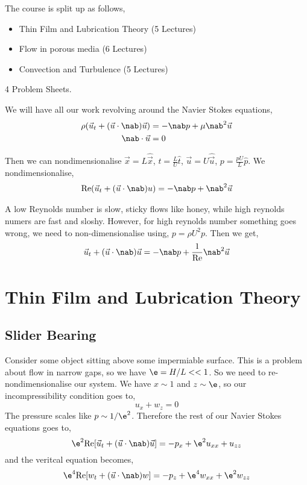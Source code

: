 
The course is split up as follows,
\begin{itemize}
  \item Thin Film and Lubrication Theory (5 Lectures)
  \item Flow in porous media (6 Lectures)
  \item Convection and Turbulence (5 Lectures)
\end{itemize}
4 Problem Sheets.

\noindent
We will have all our work revolving around the Navier Stokes equations,
\begin{align*}
  \rho( \vec u_t + (\vec u \cdot \nab)\vec u) &= -\nab p + \mu \nab^2 \vec u\\
  \nab \cdot \vec u &= 0
\end{align*}

Then we can nondimensionalise $\vec x = L\hat{\vec x}$, $t = \frac{L}{U}\hat t$, $\vec u = U\hat{\vec u}$, $p = \frac{pU}{L}\hat p$. We nondimensionalise,
\begin{align*}
  \mathrm{Re} (\vec u_t + (\vec u \cdot \nab) u ) = -\nab p + \nab^2 \vec u
\end{align*}

A low Reynolds number is slow, sticky flows like honey, while high reynolds numers are fast and sloshy. However, for high reynolds number something goes wrong, we need to non-dimensionalise using, $p = \rho U^2 p$. Then we get,
$$ \vec u_t + (\vec u \cdot \nab)\vec u = - \nab p + \frac{1}{\mathrm{Re}}\nab^2 \vec u $$

\section{Thin Film and Lubrication Theory}
\subsection{Slider Bearing}
Consider some object sitting above some impermiable surface. This is a problem about flow in narrow gaps, so we have $\e = H/L << 1$. So we need to re-nondimensionalise our system. We have $x \sim 1$ and $z \sim \e$, so our incompressibility condition goes to,
$$ u_x + w_z = 0 $$
The pressure scales like $p \sim 1/\e^2$. Therefore the rest of our Navier Stokes equations goes to,
$$ \e^2 \mathrm{Re} [\vec u_t + (\vec u \cdot \nab )\vec u] = -p_x + \e^2 u_{xx} + u_{zz} $$
and the veritcal equation becomes,
$$ \e^4 \mathrm{Re} [ w_t + (\vec u \cdot \nab) w] = -p_z + \e^4 w_{xx} + \e^2 w_{zz} $$

